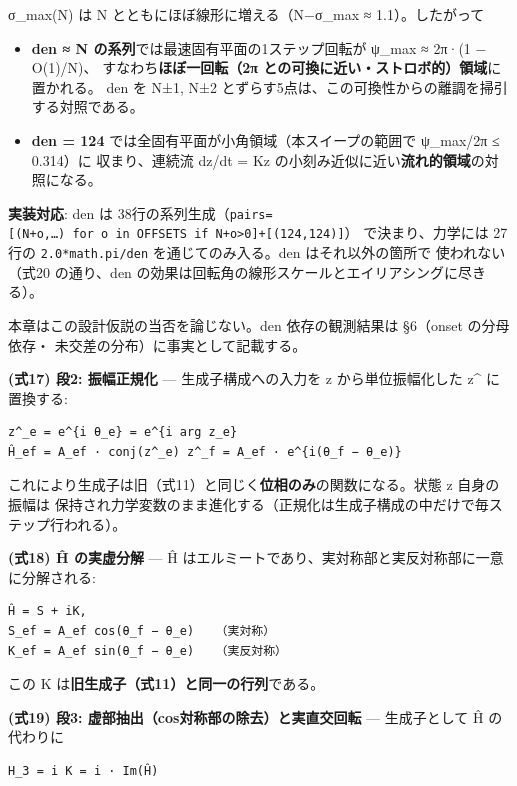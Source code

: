 \documentclass[
  a4paper,
]{ltjsarticle}
\providecommand{\tightlist}{%
  \setlength{\itemsep}{0pt}\setlength{\parskip}{0pt}}
\begin{document}
σ\_max(N) は N とともにほぼ線形に増える（N−σ\_max ≈ 1.1）。したがって

\begin{itemize}
\tightlist
\item
  \textbf{den ≈ N の系列}では最速固有平面の1ステップ回転が ψ\_max ≈
  2π·(1 − O(1)/N)、 すなわち\textbf{ほぼ一回転（2π
  との可換に近い・ストロボ的）領域}に置かれる。 den を N±1, N±2
  とずらす5点は、この可換性からの離調を掃引する対照である。
\item
  \textbf{den = 124} では全固有平面が小角領域（本スイープの範囲で
  ψ\_max/2π ≤ 0.314）に 収まり、連続流 dz/dt = Kz
  の小刻み近似に近い\textbf{流れ的領域}の対照になる。
\end{itemize}

\textbf{実装対応}: den は
38行の系列生成（\texttt{pairs={[}(N+o,…)\ for\ o\ in\ OFFSETS\ if\ N+o\textgreater{}0{]}+{[}(124,\textquotesingle{}124\textquotesingle{}){]}}）
で決まり、力学には 27行の \texttt{2.0*math.pi/den} を通じてのみ入る。den
はそれ以外の箇所で 使われない（式20 の通り、den
の効果は回転角の線形スケールとエイリアシングに尽きる）。

本章はこの設計仮説の当否を論じない。den 依存の観測結果は §6（onset
の分母依存・ 未交差の分布）に事実として記載する。

\textbf{(式17) 段2: 振幅正規化} --- 生成子構成への入力を z
から単位振幅化した z\^{} に置換する:

\begin{verbatim}
z^_e = e^{i θ_e} = e^{i arg z_e}
Ĥ_ef = A_ef · conj(z^_e) z^_f = A_ef · e^{i(θ_f − θ_e)}
\end{verbatim}

これにより生成子は旧（式11）と同じく\textbf{位相のみ}の関数になる。状態
z 自身の振幅は
保持され力学変数のまま進化する（正規化は生成子構成の中だけで毎ステップ行われる）。

\textbf{(式18) Ĥ の実虚分解} --- Ĥ
はエルミートであり、実対称部と実反対称部に一意に分解される:

\begin{verbatim}
Ĥ = S + iK,
S_ef = A_ef cos(θ_f − θ_e)   （実対称）
K_ef = A_ef sin(θ_f − θ_e)   （実反対称）
\end{verbatim}

この K は\textbf{旧生成子（式11）と同一の行列}である。

\textbf{(式19) 段3: 虚部抽出（cos対称部の除去）と実直交回転} ---
生成子として Ĥ の代わりに

\begin{verbatim}
H_3 = i K = i · Im(Ĥ)
\end{verbatim}
\end{document}
